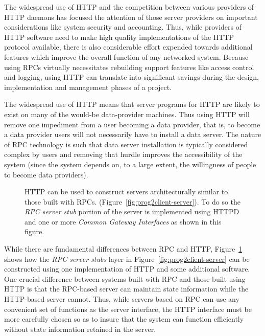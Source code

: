 The widespread use of HTTP and the competition between various providers of
HTTP daemons has focused the attention of those server providers on important
considerations like system security and accounting. Thus, while providers of
HTTP software need to make high quality implementations of the HTTP protocol
available, there is also considerable effort expended towards additional
features which improve the overall function of any networked system. Because
using RPCs virtually necessitates rebuilding support features like access
control and logging, using HTTP can translate into significant savings during
the design, implementation and management phases of a project.

The widespread use of HTTP means that server programs for HTTP are likely to
exist on many of the would-be data-provider machines. Thus using HTTP will
remove one impediment from a user becoming a data provider, that is, to
become a data provider users will not necessarily have to install a data
server. The nature of RPC technology is such that data server installation is
typically considered complex by users and removing that hurdle improves the
accessibility of the system (since the system depends on, to a large extent,
the willingness of people to become data providers).

\begin{figure}
\centerline{}
\caption{HTTP can be used to construct servers architecturally similar to
  those built with RPCs. (Figure~\protect\ref{fig:prog2client-server}).  To
  do so the {\em RPC server stub\/} portion of the server is implemented
  using HTTPD and one or more {\em Common Gateway Interfaces\/} as shown in
  this figure.}
\label{fig:http-interface}
\end{figure}

While there are fundamental differences between RPC and HTTP,
Figure~\ref{fig:http-interface} shows how the {\em RPC server stubs\/} layer
in Figure~\ref{fig:prog2client-server} can be constructed using one
implementation of HTTP and some additional software.  One crucial difference
between systems built with RPC and those built using HTTP is that the
RPC-based server can maintain state information while the HTTP-based server
cannot.  Thus, while servers based on RPC can use any convenient set of
functions as the server interface, the HTTP interface must be more carefully
chosen so as to insure that the system can function efficiently without state
information retained in the server.

